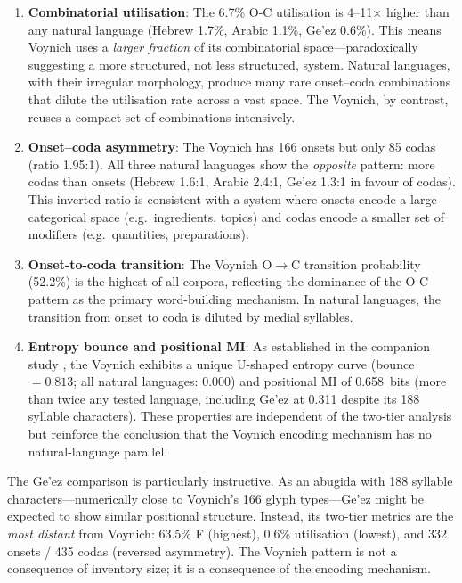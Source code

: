 \begin{enumerate}[nosep]
  \item \textbf{Combinatorial utilisation}: The 6.7\% O-C utilisation is 4--11$\times$ higher than any natural language (Hebrew 1.7\%, Arabic 1.1\%, Ge'ez 0.6\%).  This means Voynich uses a \emph{larger fraction} of its combinatorial space---paradoxically suggesting a more structured, not less structured, system.  Natural languages, with their irregular morphology, produce many rare onset--coda combinations that dilute the utilisation rate across a vast space.  The Voynich, by contrast, reuses a compact set of combinations intensively.
  \item \textbf{Onset--coda asymmetry}: The Voynich has 166 onsets but only 85 codas (ratio 1.95:1).  All three natural languages show the \emph{opposite} pattern: more codas than onsets (Hebrew 1.6:1, Arabic 2.4:1, Ge'ez 1.3:1 in favour of codas).  This inverted ratio is consistent with a system where onsets encode a large categorical space (e.g.\ ingredients, topics) and codas encode a smaller set of modifiers (e.g.\ quantities, preparations).
  \item \textbf{Onset-to-coda transition}: The Voynich O$\to$C transition probability (52.2\%) is the highest of all corpora, reflecting the dominance of the O-C pattern as the primary word-building mechanism.  In natural languages, the transition from onset to coda is diluted by medial syllables.
  \item \textbf{Entropy bounce and positional MI}: As established in the companion study \citep{jimenez2026}, the Voynich exhibits a unique U-shaped entropy curve (bounce $= 0.813$; all natural languages: 0.000) and positional MI of 0.658~bits (more than twice any tested language, including Ge'ez at 0.311 despite its 188 syllable characters).  These properties are independent of the two-tier analysis but reinforce the conclusion that the Voynich encoding mechanism has no natural-language parallel.
\end{enumerate}

The Ge'ez comparison is particularly instructive.  As an abugida with 188 syllable characters---numerically close to Voynich's 166 glyph types---Ge'ez might be expected to show similar positional structure.  Instead, its two-tier metrics are the \emph{most distant} from Voynich: 63.5\% F (highest), 0.6\% utilisation (lowest), and 332 onsets / 435 codas (reversed asymmetry).  The Voynich pattern is not a consequence of inventory size; it is a consequence of the encoding mechanism.


